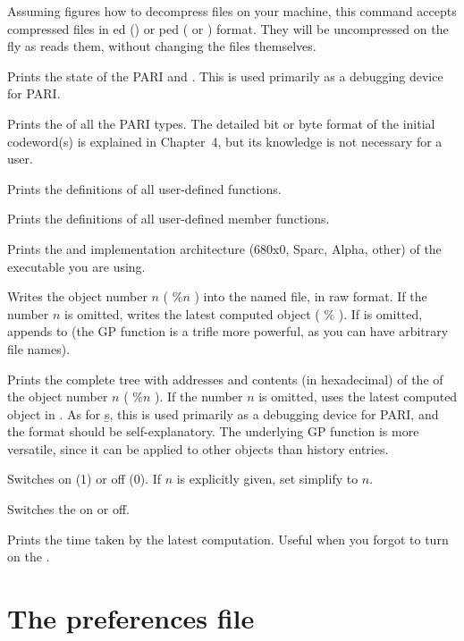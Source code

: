 Assuming  figures how to decompress files on your machine, this
command accepts compressed files in ed () or
ped ( or ) format. They will be uncompressed on
the fly as  reads them, without changing the files themselves.

 Prints the state of the PARI  and .
This is used primarily as a debugging device for PARI.

 Prints the  of all the PARI
types. The detailed bit or byte format of the initial codeword(s) is
explained in Chapter~4, but its knowledge is not necessary for a 
user.

 Prints the definitions of all user-defined functions.

 Prints the definitions of all user-defined member functions.

 Prints the  and implementation architecture
(680x0, Sparc, Alpha, other) of the  executable you are using.

 Writes the object number
$n$ ( $\%n$ ) into the named file, in raw format. If the number $n$ is
omitted, writes the latest computed object ( $\%$ ). If  is
omitted, appends to  (the GP function  is a trifle more
powerful, as you can have arbitrary file names).

 Prints the complete tree with addresses and contents
(in hexadecimal) of the  of the object number
$n$ ( $\%n$ ). If the number $n$ is omitted, uses the latest computed object
in . As for \b{s}, this is used primarily as a debugging device for
PARI, and the format should be self-explanatory. The underlying GP
function  is more versatile, since it can be applied to other
objects than history entries.

 Switches  on (1) or off (0). If $n$
is explicitly given, set simplify to $n$.

\subseckbd{\#} Switches the  on or off.

\subseckbd{\#\#} Prints the time taken by the latest computation.
Useful when you forgot to turn on the .

\section{The preferences file}
\label{se:gprc}

